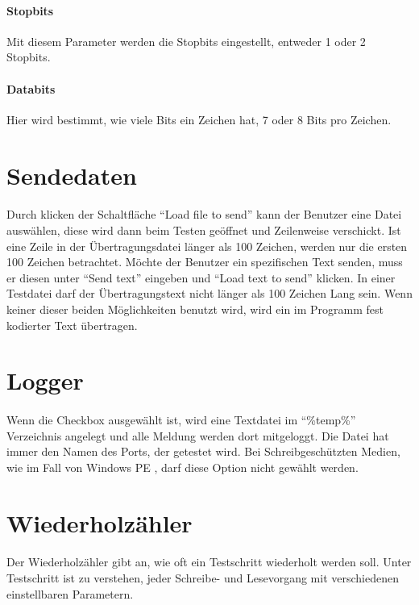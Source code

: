\paragraph{Stopbits} Mit diesem Parameter werden die Stopbits eingestellt, entweder 1 oder 2 Stopbits.
\paragraph{Databits} Hier wird bestimmt, wie viele Bits ein Zeichen hat, 7 oder 8 Bits pro Zeichen.

\section{Sendedaten}
\paragraph{}
Durch klicken der Schaltfläche "`Load file to send"' kann der Benutzer eine Datei auswählen, diese wird dann beim Testen geöffnet und Zeilenweise verschickt. Ist eine Zeile in der Übertragungsdatei länger als 100 Zeichen, werden nur die ersten 100 Zeichen betrachtet. Möchte der Benutzer ein spezifischen Text senden, muss er diesen unter "`Send text"' eingeben und "`Load text to send"' klicken. In einer Testdatei darf der Übertragungstext nicht länger als 100 Zeichen Lang sein. Wenn keiner dieser beiden Möglichkeiten benutzt wird, wird ein im Programm fest kodierter Text übertragen.

\section{Logger}
\paragraph{}
Wenn die Checkbox ausgewählt ist, wird eine Textdatei im "`\%temp\%"' Verzeichnis angelegt und alle Meldung werden dort mitgeloggt. Die Datei hat immer den Namen des Ports, der getestet wird. Bei Schreibgeschützten Medien, wie im Fall von Windows PE , darf diese Option nicht gewählt werden.


\section{Wiederholzähler}
\paragraph{}
Der Wiederholzähler gibt an, wie oft ein Testschritt wiederholt werden soll. Unter Testschritt ist zu verstehen, jeder Schreibe- und Lesevorgang mit verschiedenen einstellbaren Parametern.


